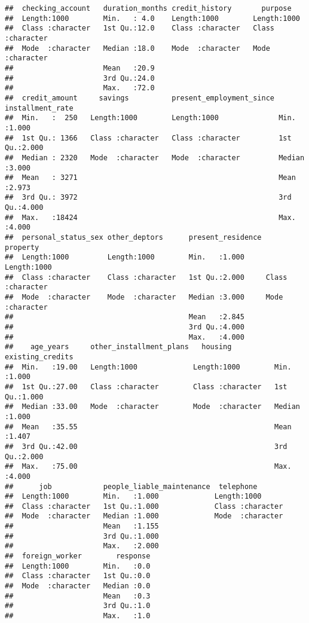 \documentclass[
]{article}
\begin{document}
\begin{verbatim}
##  checking_account   duration_months credit_history       purpose         
##  Length:1000        Min.   : 4.0    Length:1000        Length:1000       
##  Class :character   1st Qu.:12.0    Class :character   Class :character  
##  Mode  :character   Median :18.0    Mode  :character   Mode  :character  
##                     Mean   :20.9                                         
##                     3rd Qu.:24.0                                         
##                     Max.   :72.0                                         
##  credit_amount     savings          present_employment_since installment_rate
##  Min.   :  250   Length:1000        Length:1000              Min.   :1.000   
##  1st Qu.: 1366   Class :character   Class :character         1st Qu.:2.000   
##  Median : 2320   Mode  :character   Mode  :character         Median :3.000   
##  Mean   : 3271                                               Mean   :2.973   
##  3rd Qu.: 3972                                               3rd Qu.:4.000   
##  Max.   :18424                                               Max.   :4.000   
##  personal_status_sex other_deptors      present_residence   property        
##  Length:1000         Length:1000        Min.   :1.000     Length:1000       
##  Class :character    Class :character   1st Qu.:2.000     Class :character  
##  Mode  :character    Mode  :character   Median :3.000     Mode  :character  
##                                         Mean   :2.845                       
##                                         3rd Qu.:4.000                       
##                                         Max.   :4.000                       
##    age_years     other_installment_plans   housing          existing_credits
##  Min.   :19.00   Length:1000             Length:1000        Min.   :1.000   
##  1st Qu.:27.00   Class :character        Class :character   1st Qu.:1.000   
##  Median :33.00   Mode  :character        Mode  :character   Median :1.000   
##  Mean   :35.55                                              Mean   :1.407   
##  3rd Qu.:42.00                                              3rd Qu.:2.000   
##  Max.   :75.00                                              Max.   :4.000   
##      job            people_liable_maintenance  telephone        
##  Length:1000        Min.   :1.000             Length:1000       
##  Class :character   1st Qu.:1.000             Class :character  
##  Mode  :character   Median :1.000             Mode  :character  
##                     Mean   :1.155                               
##                     3rd Qu.:1.000                               
##                     Max.   :2.000                               
##  foreign_worker        response  
##  Length:1000        Min.   :0.0  
##  Class :character   1st Qu.:0.0  
##  Mode  :character   Median :0.0  
##                     Mean   :0.3  
##                     3rd Qu.:1.0  
##                     Max.   :1.0
\end{verbatim}
\end{document}
